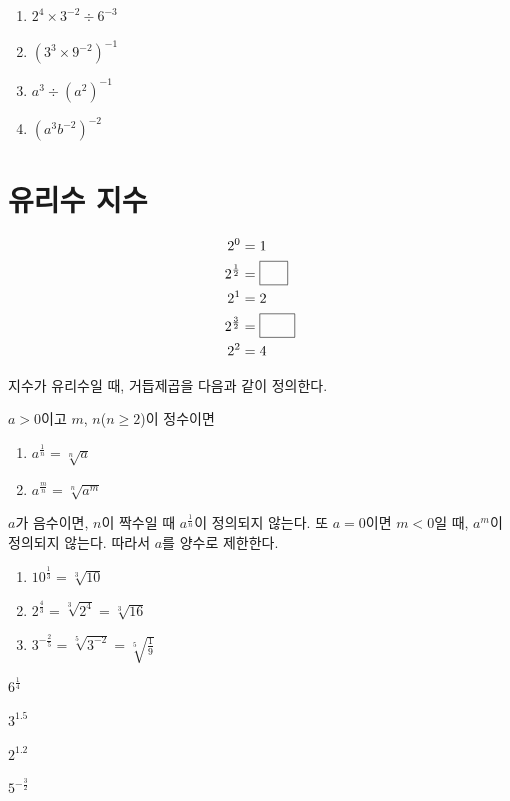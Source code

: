 \documentclass{oblivoir}
\begin{document}
%
\begin{enumerate}\label{integer7}
\item
\(2^4\times3^{-2}\div6^{-3}\)
\item
\((3^3\times9^{-2})^{-1}\)
\item
\(a^3\div(a^2)^{-1}\)
\item
\((a^3b^{-2})^{-2}\)
\end{enumerate}

\newpage
\section{유리수 지수}
%
\label{rational1}
\vspace{-20pt}
\begin{align*}
2^0			&=1\\
2^{\frac12}	&=\pb{\sqrt2}\\
2^1			&=2\\
2^{\frac32}	&=\pb{2\sqrt2}\\
2^2			&=4
\end{align*}

\noindent
지수가 유리수일 때, 거듭제곱을 다음과 같이 정의한다.
%
\begin{mdframed}
\label{rational2}
\(a>0\)이고 \(m\), \(n\)(\(n\ge2\))이 정수이면
\begin{enumerate}
\item
\(\displaystyle a^{\frac1n}=\sqrt[n]a\)
\item
\(\displaystyle a^{\frac mn}=\sqrt[n]{a^m}\)
\end{enumerate}
\end{mdframed}
\(a\)가 음수이면, \(n\)이 짝수일 때 \(a^{\frac1n}\)이 정의되지 않는다.
또 \(a=0\)이면 \(m<0\)일 때, \(a^m\)이 정의되지 않는다.
따라서 \(a\)를 양수로 제한한다.

%
\exam{}
\begin{enumerate}\label{rational3}
\item
\(10^{\frac13}=\sqrt[3]{10}\)
\item
\(2^{\frac43}=\sqrt[3]{2^4}=\sqrt[3]{16}\)
\item
\(3^{-\frac25}=\sqrt[5]{3^{-2}}=\sqrt[5]{\frac19}\)
\end{enumerate}

\vspace{-10pt}
%
\label{rational4}
\begin{enumerate*}[itemjoin=\hspace{.2\textwidth}]
\item
\(6^{\frac14}\)
\item
\(3^{1.5}\)
\item
\(2^{1.2}\)
\item
\(5^{-\frac32}\)
\end{enumerate*}
\end{document}
